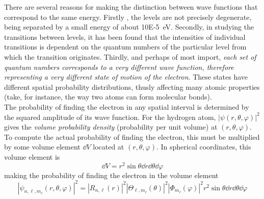 \documentclass{subfiles}
\begin{document}
				There are several reasons for making the distinction between wave functions that correspond to the same energy. Firstly , the levels are not precisely degenerate, being separated by a small energy of about \SI{10E-5}{eV}. Secondly, in studying the transitions between levels, it has been found that the intensities of individual transitions is dependent on the quantum numbers of the particular level from which the transition originates. Thirdly, and perhaps of most import, \textit{each set of quantum numbers corresponds to a very different wave function, therefore representing a very different state of motion of the electron}. These states have different spatial probability distributions, thusly affecting many atomic properties (take, for instance, the way two atoms can form molecular bonds). \\
			The probability of finding the electron in any spatial interval is determined by the squared amplitude of its wave function. For the hydrogen atom, \(|\psi(r, \theta, \varphi)|^2\) gives the \textit{volume probability density} (probability per unit volume) at \((r, \theta, \varphi)\). To compute the actual probability of finding the electron, this must be multiplied by some volume element \(\dd{V}\) located at \((r, \theta, \varphi)\). In spherical coordinates, this volume element is
				\[\dd{V} = r^2\sin\theta\dd{r}\dd{\theta}\dd{\varphi}\]
				making the probability of finding the electron in the volume element
				\[
					|\psi_{n, \ell, m_\ell}(r, \theta, \varphi)|^2 = |R_{n, \ell}(r)|^2|\Theta_{\ell, m_\ell}(\theta)|^2|\Phi_{m_\ell}(\varphi)|^2r^2\sin\theta\dd{r}\dd{\theta}\dd{\varphi}
						\tag{complete probability density}
				\]
\end{document}
